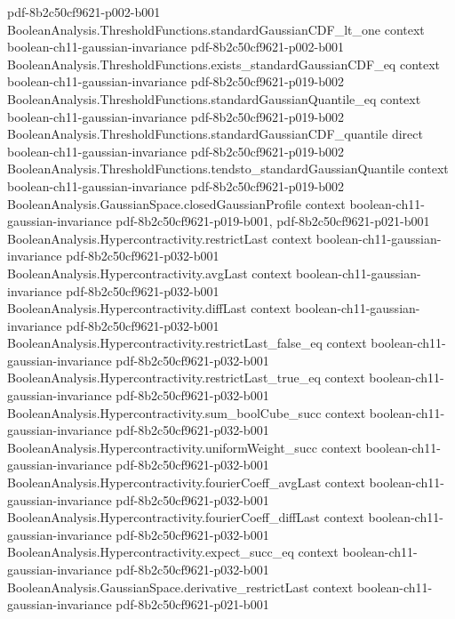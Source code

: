 \begin{theorem}
  {pdf-8b2c50cf9621-p002-b001}
\proofstep
  {BooleanAnalysis.ThresholdFunctions.standardGaussianCDF_lt_one}
  {context}
  {boolean-ch11-gaussian-invariance}
  {pdf-8b2c50cf9621-p002-b001}
\proofstep
  {BooleanAnalysis.ThresholdFunctions.exists_standardGaussianCDF_eq}
  {context}
  {boolean-ch11-gaussian-invariance}
  {pdf-8b2c50cf9621-p019-b002}
\proofstep
  {BooleanAnalysis.ThresholdFunctions.standardGaussianQuantile_eq}
  {context}
  {boolean-ch11-gaussian-invariance}
  {pdf-8b2c50cf9621-p019-b002}
\proofstep
  {BooleanAnalysis.ThresholdFunctions.standardGaussianCDF_quantile}
  {direct}
  {boolean-ch11-gaussian-invariance}
  {pdf-8b2c50cf9621-p019-b002}
\proofstep
  {BooleanAnalysis.ThresholdFunctions.tendsto_standardGaussianQuantile}
  {context}
  {boolean-ch11-gaussian-invariance}
  {pdf-8b2c50cf9621-p019-b002}
\proofstep
  {BooleanAnalysis.GaussianSpace.closedGaussianProfile}
  {context}
  {boolean-ch11-gaussian-invariance}
  {pdf-8b2c50cf9621-p019-b001,
    pdf-8b2c50cf9621-p021-b001}
\proofstep
  {BooleanAnalysis.Hypercontractivity.restrictLast}
  {context}
  {boolean-ch11-gaussian-invariance}
  {pdf-8b2c50cf9621-p032-b001}
\proofstep
  {BooleanAnalysis.Hypercontractivity.avgLast}
  {context}
  {boolean-ch11-gaussian-invariance}
  {pdf-8b2c50cf9621-p032-b001}
\proofstep
  {BooleanAnalysis.Hypercontractivity.diffLast}
  {context}
  {boolean-ch11-gaussian-invariance}
  {pdf-8b2c50cf9621-p032-b001}
\proofstep
  {BooleanAnalysis.Hypercontractivity.restrictLast_false_eq}
  {context}
  {boolean-ch11-gaussian-invariance}
  {pdf-8b2c50cf9621-p032-b001}
\proofstep
  {BooleanAnalysis.Hypercontractivity.restrictLast_true_eq}
  {context}
  {boolean-ch11-gaussian-invariance}
  {pdf-8b2c50cf9621-p032-b001}
\proofstep
  {BooleanAnalysis.Hypercontractivity.sum_boolCube_succ}
  {context}
  {boolean-ch11-gaussian-invariance}
  {pdf-8b2c50cf9621-p032-b001}
\proofstep
  {BooleanAnalysis.Hypercontractivity.uniformWeight_succ}
  {context}
  {boolean-ch11-gaussian-invariance}
  {pdf-8b2c50cf9621-p032-b001}
\proofstep
  {BooleanAnalysis.Hypercontractivity.fourierCoeff_avgLast}
  {context}
  {boolean-ch11-gaussian-invariance}
  {pdf-8b2c50cf9621-p032-b001}
\proofstep
  {BooleanAnalysis.Hypercontractivity.fourierCoeff_diffLast}
  {context}
  {boolean-ch11-gaussian-invariance}
  {pdf-8b2c50cf9621-p032-b001}
\proofstep
  {BooleanAnalysis.Hypercontractivity.expect_succ_eq}
  {context}
  {boolean-ch11-gaussian-invariance}
  {pdf-8b2c50cf9621-p032-b001}
\proofstep
  {BooleanAnalysis.GaussianSpace.derivative_restrictLast}
  {context}
  {boolean-ch11-gaussian-invariance}
  {pdf-8b2c50cf9621-p021-b001}

\end{theorem}
